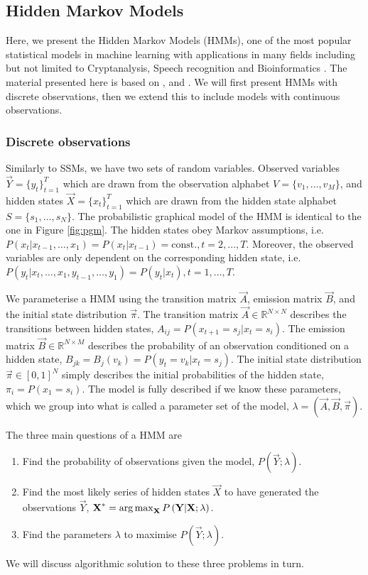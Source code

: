 \subsection{Hidden Markov Models}
	Here, we present the Hidden Markov Models (HMMs), one of the most popular statistical models in machine learning with applications in many fields including but not limited to Cryptanalysis, Speech recognition and Bioinformatics \cite{wiki:HMM}. The material presented here is based on \cite{rabiner1989tutorial}, \cite{ramage07} and \cite{mlBook}. We will first present HMMs with discrete observations, then we extend this to include models with continuous observations.
	
\subsubsection{Discrete observations}
	Similarly to SSMs, we have two sets of random variables. Observed variables $\vec Y = \{ y_t \}_{t = 1}^T$ which are drawn from the observation alphabet $V = \{v_1, \dotsc, v_M\}$, and hidden states $\vec X = \{ x_t \}_{t = 1}^T$ which are drawn from the hidden state alphabet $S = \{ s_1, \dotsc, s_N \}$. The probabilistic graphical model of the HMM is identical to the one in Figure \ref{fig:pgm}. The hidden states obey Markov assumptions, i.e. $P( x_t | x_{t - 1}, \dotsc, x_1) = P(x_t | x_{t - 1}) = \text{const.}, t = 2, \dotsc, T$. Moreover, the observed variables are only dependent on the corresponding hidden state, i.e. $P( y_t | x_t, \dotsc, x_1, y_{t - 1}, \dotsc, y_1) = P(y_t | x_t), t = 1, \dotsc, T$.
	
	We parameterise a HMM using the transition matrix $\vec A$, emission matrix $\vec B$, and the initial state distribution $\vec \pi$. The transition matrix $\vec A \in \mathbb{R}^{N \times N}$ describes the transitions between hidden states, $A_{ij} = P(x_{t + 1} = s_j | x_t = s_i)$. The emission matrix $\vec B \in \mathbb{R}^{N \times M}$ describes the probability of an observation conditioned on a hidden state, $B_{jk} = B_{j}(v_k) = P(y_t = v_k | x_t = s_j)$. The initial state distribution $\vec \pi \in [0, 1]^N$ simply describes the initial probabilities of the hidden state, $\pi_i = P(x_1 = s_i)$. The model is fully described if we know these parameters, which we group into what is called a parameter set of the model, $\lambda = (\vec A, \vec B, \vec \pi)$.
	
	The three main questions of a HMM are
	\begin{enumerate}
		\item Find the probability of observations given the model, $P\left(\vec Y; \lambda\right)$.
		\item Find the most likely series of hidden states $\vec X$ to have generated the observations $\vec Y$, $\boldsymbol{\mathbf{X}}^\ast = \operatorname*{arg\,max}_{\boldsymbol{\mathbf{X}}} P\left(\boldsymbol{\mathbf{Y}} | \boldsymbol{\mathbf{X}}; \lambda\right)$.
		\item Find the parameters $\lambda$ to maximise $P\left(\vec Y; \lambda\right)$.
	\end{enumerate}
	We will discuss algorithmic solution to these three problems in turn.

